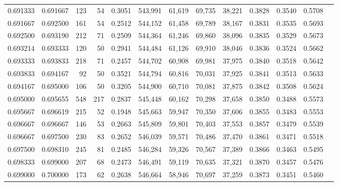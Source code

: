 \begin{tabular}{rrrrrrrrrrrrr}
0.691333 & 0.691667 &   123 &  54 &                                     0.3051 & 543,991 &  61,619 &  69,735 &  38,221 & 0.3828 & 0.3540 & 0.5708 \\
0.691667 & 0.692500 &   161 &  54 &                                     0.2512 & 544,152 &  61,458 &  69,789 &  38,167 & 0.3831 & 0.3535 & 0.5693 \\
0.692500 & 0.693190 &   212 &  71 &                                     0.2509 & 544,364 &  61,246 &  69,860 &  38,096 & 0.3835 & 0.3529 & 0.5673 \\
0.693214 & 0.693333 &   120 &  50 &                                     0.2941 & 544,484 &  61,126 &  69,910 &  38,046 & 0.3836 & 0.3524 & 0.5662 \\
0.693333 & 0.693833 &   218 &  71 &                                     0.2457 & 544,702 &  60,908 &  69,981 &  37,975 & 0.3840 & 0.3518 & 0.5642 \\
0.693833 & 0.694167 &    92 &  50 &                                     0.3521 & 544,794 &  60,816 &  70,031 &  37,925 & 0.3841 & 0.3513 & 0.5633 \\
0.694167 & 0.695000 &   106 &  50 &                                     0.3205 & 544,900 &  60,710 &  70,081 &  37,875 & 0.3842 & 0.3508 & 0.5624 \\
0.695000 & 0.695655 &   548 & 217 &                                     0.2837 & 545,448 &  60,162 &  70,298 &  37,658 & 0.3850 & 0.3488 & 0.5573 \\
0.695667 & 0.696619 &   215 &  52 &                                     0.1948 & 545,663 &  59,947 &  70,350 &  37,606 & 0.3855 & 0.3483 & 0.5553 \\
0.696667 & 0.696667 &   146 &  53 &                                     0.2663 & 545,809 &  59,801 &  70,403 &  37,553 & 0.3857 & 0.3479 & 0.5539 \\
0.696667 & 0.697500 &   230 &  83 &                                     0.2652 & 546,039 &  59,571 &  70,486 &  37,470 & 0.3861 & 0.3471 & 0.5518 \\
0.697500 & 0.698310 &   245 &  81 &                                     0.2485 & 546,284 &  59,326 &  70,567 &  37,389 & 0.3866 & 0.3463 & 0.5495 \\
0.698333 & 0.699000 &   207 &  68 &                                     0.2473 & 546,491 &  59,119 &  70,635 &  37,321 & 0.3870 & 0.3457 & 0.5476 \\
0.699000 & 0.700000 &   173 &  62 &                                     0.2638 & 546,664 &  58,946 &  70,697 &  37,259 & 0.3873 & 0.3451 & 0.5460 \\

\end{tabular}
